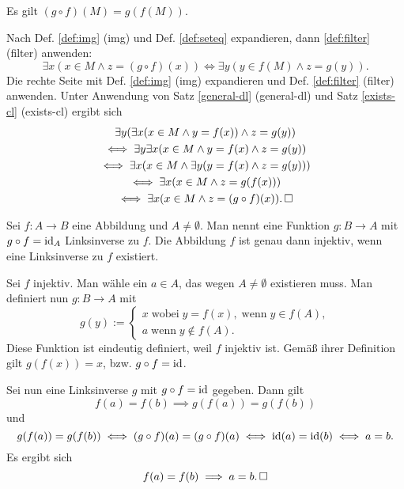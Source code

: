\begin{Satz}\label{img-chain}
Es gilt $(g\circ f)(M) = g(f(M))$.
\end{Satz}
\begin{Beweis}
Nach Def. \ref{def:img} (img) und Def. \ref{def:seteq} expandieren,
dann \ref{def:filter} (filter) anwenden:%
\[\exists x(x\in M\land z=(g\circ f)(x))
\iff \exists y(y\in f(M)\land z=g(y)).\]
Die rechte Seite mit Def. \ref{def:img} (img) expandieren und
Def. \ref{def:filter} (filter) anwenden. Unter Anwendung von
Satz \ref{general-dl} (general-dl) und Satz \ref{exists-cl} (exists-cl)
ergibt sich%
\begin{gather*}
\exists y(\exists x(x\in M\land y=f(x))\land z=g(y))\\
\iff \exists y\exists x(x\in M\land y=f(x)\land z=g(y))\\
\iff \exists x(x\in M\land\exists y(y=f(x)\land z=g(y)))\\
\iff \exists x(x\in M\land z=g(f(x)))\\
\iff \exists x(x\in M\land z=(g\circ f)(x)).\,\square
\end{gather*}
\end{Beweis}

\begin{Satz}\label{left-inverse}
Sei $f\colon A\to B$ eine Abbildung und $A\ne\emptyset$. Man nennt
eine Funktion $g\colon B\to A$ mit $g\circ f=\operatorname{id}_A$ Linksinverse
zu $f$. Die Abbildung $f$ ist genau dann injektiv, wenn eine
Linksinverse zu $f$ existiert.
\end{Satz}
\begin{Beweis}
Sei $f$ injektiv. Man wähle ein $a\in A$, das wegen $A\ne\emptyset$
existieren muss. Man definiert nun $g\colon B\to A$ mit%
\[g(y):=\begin{cases}
x\;\text{wobei}\;y=f(x),\;\text{wenn}\;y\in f(A),\\
a\;\text{wenn}\;y\notin f(A).
\end{cases}\]
Diese Funktion ist eindeutig definiert, weil $f$ injektiv ist.
Gemäß ihrer Definition gilt $g(f(x))=x$, bzw. $g\circ f = \operatorname{id}$.

Sei nun eine Linksinverse $g$ mit $g\circ f=\operatorname{id}$ gegeben. Dann gilt
\[f(a)=f(b) \implies g(f(a))=g(f(b))\]
und
\[g(f(a))=g(f(b))
\iff (g\circ f)(a)=(g\circ f)(a)
\iff \operatorname{id}(a)=\operatorname{id}(b)
\iff a=b.\]
Es ergibt sich
\[f(a)=f(b)\implies a=b.\,\square\]
\end{Beweis}

